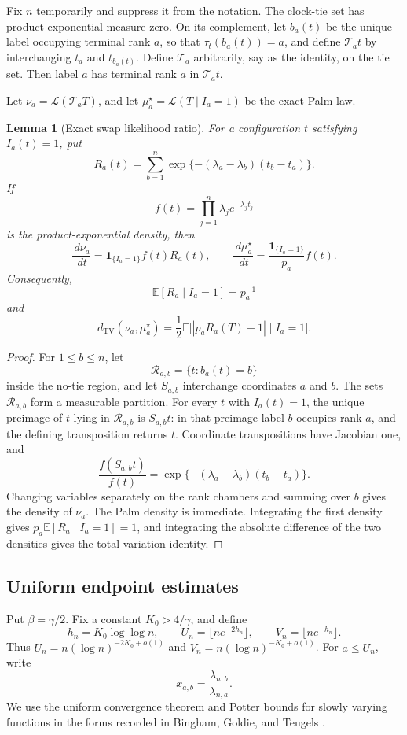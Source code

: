 \documentclass[11pt]{article}
\newtheorem{lemma}[theorem]{Lemma}
\theoremstyle{remark}
\newcommand{\Ee}{\mathbb E}
\newcommand{\one}{\mathbf 1}
\newcommand{\TV}{\mathrm{TV}}
\newcommand{\dd}{\,d}
\begin{document}
Fix $n$ temporarily and suppress it from the notation.  The clock-tie set has
product-exponential measure zero.  On its complement, let $b_a(t)$ be the
unique label occupying terminal rank $a$, so that $\tau_t(b_a(t))=a$, and
define $\mathcal T_at$ by interchanging $t_a$ and $t_{b_a(t)}$.  Define
$\mathcal T_a$ arbitrarily, say as the identity, on the tie set.  Then label
$a$ has terminal rank $a$ in $\mathcal T_at$.

Let $\nu_a=\mathcal L(\mathcal T_aT)$, and let
$\mu_a^\star=\mathcal L(T\mid I_a=1)$ be the exact Palm law.

\begin{lemma}[Exact swap likelihood ratio]\label{lem:swap-likelihood}
For a configuration $t$ satisfying $I_a(t)=1$, put
\[
        R_a(t)=\sum_{b=1}^n
        \exp\{-(\lambda_a-\lambda_b)(t_b-t_a)\}.
\]
If
\[
        f(t)=\prod_{j=1}^n\lambda_j e^{-\lambda_jt_j}
\]
is the product-exponential density, then
\[
        \frac{\dd\nu_a}{\dd t}        =\one_{\{I_a=1\}}f(t)R_a(t),
        \qquad
        \frac{\dd\mu_a^\star}{\dd t}
        =\frac{\one_{\{I_a=1\}}}{p_a}f(t).
\]
Consequently,
\[
        \Ee[R_a\mid I_a=1]=p_a^{-1}
\]
and
\[
        d_{\TV}(\nu_a,\mu_a^\star)
        =\frac12\Ee\bigl[|p_aR_a(T)-1|\mid I_a=1\bigr].
\]
\end{lemma}

\begin{proof}
For $1\le b\le n$, let
\[
        \mathcal R_{a,b}=\{t:b_a(t)=b\}
\]
inside the no-tie region, and let $S_{a,b}$ interchange coordinates $a$ and
$b$.  The sets $\mathcal R_{a,b}$ form a measurable partition.  For every
$t$ with $I_a(t)=1$, the unique preimage of $t$ lying in
$\mathcal R_{a,b}$ is $S_{a,b}t$: in that preimage label $b$ occupies rank
$a$, and the defining transposition returns $t$.  Coordinate transpositions
have Jacobian one, and
\[
        \frac{f(S_{a,b}t)}{f(t)}
        =\exp\{-(\lambda_a-\lambda_b)(t_b-t_a)\}.
\]
Changing variables separately on the rank chambers and summing over $b$ gives
the density of $\nu_a$.  The Palm density is immediate.  Integrating the
first density gives $p_a\Ee[R_a\mid I_a=1]=1$, and integrating the absolute
difference of the two densities gives the total-variation identity.
\end{proof}

\subsection{Uniform endpoint estimates}

Put $\beta=\gamma/2$.  Fix a constant $K_0>4/\gamma$, and define
\[
        h_n=K_0\log\log n,
        \qquad
        U_n=\lfloor ne^{-2h_n}\rfloor,
        \qquad
        V_n=\lfloor ne^{-h_n}\rfloor.
\]
Thus $U_n=n(\log n)^{-2K_0+o(1)}$ and
$V_n=n(\log n)^{-K_0+o(1)}$.  For $a\le U_n$, write
\[
        x_{a,b}=\frac{\lambda_{n,b}}{\lambda_{n,a}}.
\]
We use the uniform convergence theorem and Potter bounds for slowly varying
functions in the forms recorded in Bingham, Goldie, and Teugels
\cite[Theorems 1.2.1 and 1.5.6]{BGT1987}.
\end{document}
